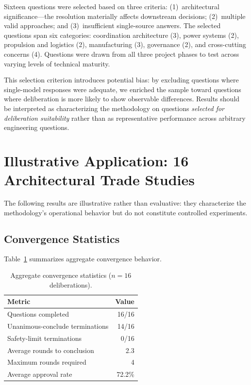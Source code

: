 \documentclass[11pt,a4paper]{article}
\begin{document}
Sixteen questions were selected based on three criteria: (1)~architectural significance---the resolution materially affects downstream decisions; (2)~multiple valid approaches; and (3)~insufficient single-source answers. The selected questions span six categories: coordination architecture (3), power systems (2), propulsion and logistics (2), manufacturing (3), governance (2), and cross-cutting concerns (4). Questions were drawn from all three project phases to test across varying levels of technical maturity.

This selection criterion introduces potential bias: by excluding questions where single-model responses were adequate, we enriched the sample toward questions where deliberation is more likely to show observable differences. Results should be interpreted as characterizing the methodology on questions \emph{selected for deliberation suitability} rather than as representative performance across arbitrary engineering questions.

\section{Illustrative Application: 16 Architectural Trade Studies}
\label{sec:results}

The following results are illustrative rather than evaluative: they characterize the methodology's operational behavior but do not constitute controlled experiments.

\subsection{Convergence Statistics}

Table~\ref{tab:convergence} summarizes aggregate convergence behavior.

\begin{table}[ht]
\centering
\caption{Aggregate convergence statistics ($n = 16$ deliberations).}
\label{tab:convergence}
\begin{tabular}{@{}lr@{}}
\toprule
\textbf{Metric} & \textbf{Value} \\
\midrule
Questions completed & 16/16 \\
Unanimous-conclude terminations & 14/16 \\
Safety-limit terminations & 0/16 \\
Average rounds to conclusion & 2.3 \\
Maximum rounds required & 4 \\
Average approval rate & 72.2\% \\
\bottomrule
\end{tabular}
\end{table}
\end{document}
